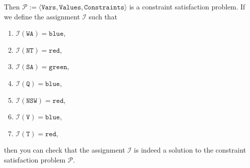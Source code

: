 Then $\mathcal{P} := \langle \texttt{Vars}, \texttt{Values}, \texttt{Constraints} \rangle$ is a constraint satisfaction problem.  
If we define the assignment $\mathcal{I}$ such that
\begin{enumerate}
\item $\mathcal{I}(\mathtt{WA}) = \texttt{blue}$,
\item $\mathcal{I}(\mathtt{NT}) = \texttt{red}$,
\item $\mathcal{I}(\mathtt{SA}) = \texttt{green}$,
\item $\mathcal{I}(\mathtt{Q}) = \texttt{blue}$,
\item $\mathcal{I}(\mathtt{NSW}) = \texttt{red}$,
\item $\mathcal{I}(\mathtt{V}) = \texttt{blue}$,
\item $\mathcal{I}(\mathtt{T}) = \texttt{red}$,
\end{enumerate}
then you can check that the assignment $\mathcal{I}$ is indeed a solution to the constraint satisfaction problem $\mathcal{P}$.

